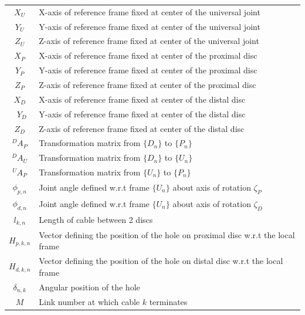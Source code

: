\documentclass[a4paper,12pt]{report}
\begin{document}
\begin{appendices}
\begin{center}
\begin{longtable}{|c|p{12cm}|}
			$X_{U}$ & X-axis of reference frame fixed at center of the universal joint\\
			$Y_{U}$ & Y-axis of reference frame fixed at center of the universal joint\\
			$Z_{U}$ & Z-axis of reference frame fixed at center of the universal joint\\
			$X_{P}$ & X-axis of reference frame fixed at center of the proximal disc\\
			$Y_{P}$ & Y-axis of reference frame fixed at center of the proximal disc\\
			$Z_{P}$ & Z-axis of reference frame fixed at center of the proximal disc\\
			$X_{D}$ & X-axis of reference frame fixed at center of the distal disc\\\
			$Y_{D}$ & Y-axis of reference frame fixed at center of the distal disc\\
			$Z_{D}$ & Z-axis of reference frame fixed at center of the distal disc\\
			
			$^{D}A_{P}$  & Transformation matrix from $\{D_n\}$ to $\{P_n\}$ \\
			$^{D}A_{U}$  & Transformation matrix from $\{D_n\}$ to $\{U_n\}$ \\
			$^{U}A_{P}$  & Transformation matrix from $\{U_n\}$ to $\{P_n\}$ \\
			$\phi_{p, n}$ & Joint angle defined w.r.t frame $\{U_n\}$ about axis of rotation $\zeta_{P}$\\
			$\phi_{d, n}$ & Joint angle defined w.r.t frame $\{U_n\}$ about axis of rotation $\zeta_{D}$\\
			
			$l_{k, n}$ & Length of cable between 2 discs\\
			$H_{p, k, n}$ & Vector defining the position of the hole on proximal disc w.r.t the local frame\\
			$H_{d, k, n}$ & Vector defining the position of the hole on distal disc w.r.t the local frame\\
			
			$\delta_{n, k}$ & Angular position of the hole\\
			
			$M$ & Link number at which cable $k$ terminates\\
			
			

\end{longtable}
\end{center}
\end{appendices}
\end{document}

